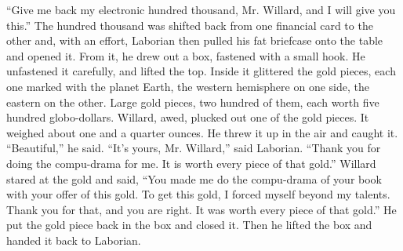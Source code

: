 \documentclass[a4paper,12pt]{article}
\begin{document}
“Give me back my electronic hundred thousand, Mr. Willard, and I will give you this.”
The hundred thousand was shifted back from one financial card to the other and, with an effort,
Laborian then pulled his fat briefcase onto the table and opened it. From it, he drew out a box, fastened
with a small hook. He unfastened it carefully, and lifted the top. Inside it glittered the gold pieces, each one
marked with the planet Earth, the western hemisphere on one side, the eastern on the other. Large gold
pieces, two hundred of them, each worth five hundred globo-dollars.
Willard, awed, plucked out one of the gold pieces. It weighed about one and a quarter ounces. He
threw it up in the air and caught it.
“Beautiful,” he said.
“It’s yours, Mr. Willard,” said Laborian. “Thank you for doing the compu-drama for me. It is
worth every piece of that gold.”
Willard stared at the gold and said, “You made me do the compu-drama of your book with your
offer of this gold. To get this gold, I forced myself beyond my talents. Thank you for that, and you are
right. It was worth every piece of that gold.”
He put the gold piece back in the box and closed it. Then he lifted the box and handed it back to
Laborian.
\end{document}

